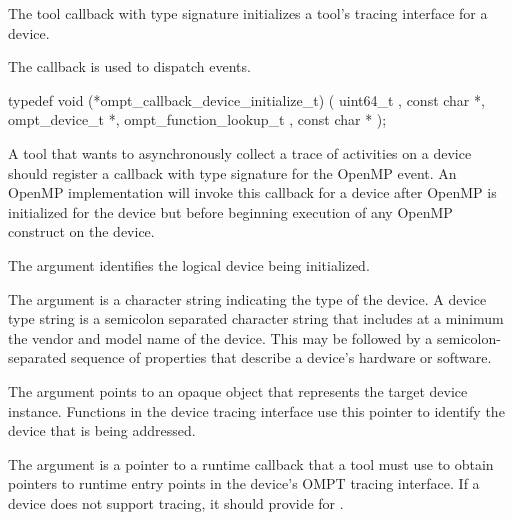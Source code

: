 \begin{itemize}
\begin{itemize}
\label{sec:ompt_callback_device_initialize_t}

\summary The tool callback with type signature
 initializes a
tool's tracing interface for a device.

The  callback is used to dispatch
 events.

\format

\begin{ccppspecific}
\begin{omptCallback}
typedef void (*ompt_callback_device_initialize_t) (
  uint64_t ,
  const char *,
  ompt_device_t *,
  ompt_function_lookup_t ,
  const char *
);
\end{omptCallback}
\end{ccppspecific}


\descr

A tool that wants to asynchronously collect a trace of
activities on a device should register a callback with type signature
 for the
 OpenMP event. An OpenMP
implementation will invoke this callback for a device after OpenMP is
initialized for the device but before beginning execution of any
OpenMP construct on the device.

\argdesc

The argument  identifies the logical device
being initialized.

The argument  is a character string indicating the
type of the device. A device type string is a semicolon separated
character string that includes at a minimum the vendor and model name
of the device. This may be followed by a semicolon-separated sequence
of properties that describe a device's hardware or software.

The  argument points to an opaque object that represents 
the target device instance. Functions in the device tracing interface 
use this pointer to identify the device that is being addressed.

The argument  is a pointer to a runtime callback
that a tool must use to obtain pointers to runtime entry points in the
device's OMPT tracing interface. If a device does not support tracing,
it should provide  for .


\end{itemize}
\end{itemize}
